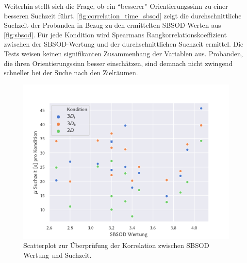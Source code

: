 Weiterhin stellt sich die Frage, ob ein \enquote{besserer} Orientierungssinn zu einer besseren Suchzeit führt.
\autoref{fig:correlation_time_sbsod} zeigt die durchschnittliche Suchzeit der Probanden in Bezug zu den ermittelten SBSOD-Werten aus \autoref{fig:sbsod}.
Für jede Kondition wird Spearmans Rangkorrelationskoeffizient zwischen der SBSOD-Wertung und der durchschnittlichen Suchzeit ermittel.
Die Tests weisen keinen signifikanten Zusammenhang der Variablen aus.
Probanden, die ihren Orientierungssinn besser einschätzen, sind demnach nicht zwingend schneller bei der Suche nach den Zielräumen.
\begin{figure}
    \centering
    \includegraphics[width=\linewidth]{figures/analysis/correlation_time_sbsod_scatter}
    \caption{Scatterplot zur Überprüfung der Korrelation zwischen SBSOD Wertung und Suchzeit.}
    \label{fig:correlation_time_sbsod}
\end{figure}

